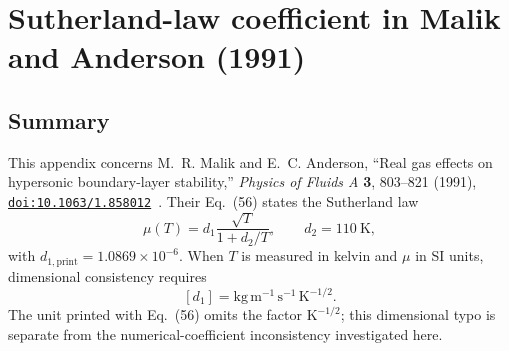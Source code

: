 \chapter{Sutherland-law coefficient in Malik and Anderson (1991)}
\label{app:malik-anderson-sutherland}

\begingroup
{}

\newcommand{\maAppName}{Malik--Anderson}
\newcommand{\maAppDd}{\mathrm{d}}
\newcommand{\maAppUe}{u_e}
\newcommand{\maAppTe}{T_e}
\newcommand{\maAppRhoe}{\rho_e}
\newcommand{\maAppMue}{\mu_e}
\newcommand{\maAppCpe}{c_{p,e}}
\newcommand{\maAppPrzero}{Pr_0}

\newcommand{\maAppNote}[2]{%
  \vspace{0.3em}%
  \noindent\colorbox{#1}{%
    \begin{minipage}{\dimexpr\linewidth-2\fboxsep\relax}
      #2
    \end{minipage}}%
  \vspace{0.3em}%
}

\newcommand{\maAppEqbox}[2]{%
  \vspace{0.1em}%
  \noindent\fcolorbox{MAAppRule}{#1}{%
    \begin{minipage}{\dimexpr\linewidth-2\fboxsep-2\fboxrule\relax}
      #2
    \end{minipage}}%
  \vspace{0.1em}%
}

\section{Summary}
\label{app:ma:sec:short_conclusion}
This appendix concerns M.~R. Malik and E.~C. Anderson, ``Real gas effects on hypersonic boundary-layer stability,'' \emph{Physics of Fluids A} \textbf{3}, 803--821 (1991), \href{https://doi.org/10.1063/1.858012}{\nolinkurl{doi:10.1063/1.858012}}~\cite{MalikAnderson1991RealGas}. Their Eq.~(56) states the Sutherland law
\[
  \mu(T)=d_1\frac{\sqrt{T}}{1+d_2/T},
  \qquad d_2=110~\mathrm{K},
\]
with \(d_{1,\mathrm{print}}=1.0869\times10^{-6}\). When \(T\) is measured in kelvin and \(\mu\) in SI units, dimensional consistency requires
\[
  [d_1]=\mathrm{kg\,m^{-1}\,s^{-1}\,K^{-1/2}}.
\]
The unit printed with Eq.~(56) omits the factor \(\mathrm{K^{-1/2}}\); this dimensional typo is separate from the numerical-coefficient inconsistency investigated here.

